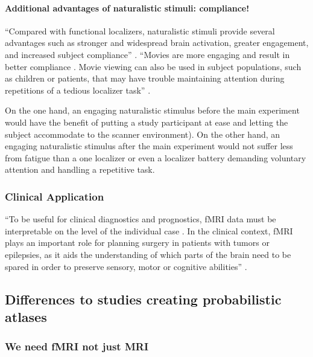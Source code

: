 \paragraph{Additional advantages of naturalistic stimuli: compliance!}
%
``Compared with functional localizers, naturalistic stimuli provide several
advantages such as stronger and widespread brain activation, greater engagement,
and increased subject compliance'' \citep{jiahui2020predicting}.
%
``Movies are more engaging and result in better compliance
\citep{vanderwal2015inscapes}.
%
Movie viewing can also be used in subject populations, such as children
\citep{richardson2018development} or patients, that may have trouble maintaining
attention during repetitions of a tedious localizer task''
\citep{jiahui2020predicting}.

%
On the one hand, an engaging naturalistic stimulus before the main experiment
would have the benefit of putting a study participant at ease and letting the
subject accommodate to the scanner environment).
%
On the other hand, an engaging naturalistic stimulus after the main experiment
would not suffer less from fatigue than a one localizer or even a localizer
battery demanding voluntary attention and handling a repetitive task.


\subsubsection{Clinical Application}


``To be useful for clinical diagnostics and prognostics, fMRI data must be
interpretable on the level of the individual case \citep{dubois2016building}.
%
In the clinical context, fMRI plays an important role for planning surgery in
patients with tumors or epilepsies, as it aids the understanding of which parts
of the brain need to be spared in order to preserve sensory, motor or cognitive
abilities'' \citep{wegrzyn2018thought}.



\subsection{Differences to studies creating probabilistic atlases}


\subsubsection{We need fMRI not just MRI}

